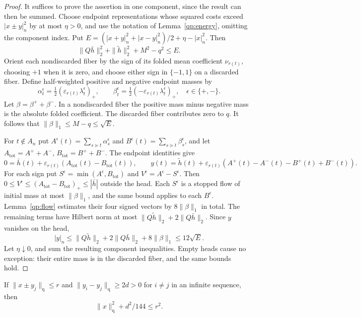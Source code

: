 \begin{proof}
It suffices to prove the assertion in one component, since the
result can then be summed.  Choose endpoint representations whose
squared costs exceed $|x\pm y|_n^2$ by at most $\eta>0$, and use
the notation of Lemma~\ref{qp:energy}, omitting the component index.
Put $E=(|x+y|_n^2+|x-y|_n^2)/2+\eta-|x|_n^2$.
Then
\[
 \|Q\bar h\|_2^2+\|\widetilde h\|_2^2+M^2-q^2\le E.
\]
Orient each nondiscarded fiber by the sign of its folded mean
coefficient $\nu_{r(t)}$, choosing $+1$ when it is zero, and choose
either sign in $\{-1,1\}$ on a discarded fiber.
Define half-weighted positive and negative endpoint masses by
\[
 \alpha_t^\epsilon=\tfrac12(\varepsilon_{r(t)}
                         \lambda_t^\epsilon)_+,
 \qquad
 \beta_t^\epsilon=\tfrac12(-\varepsilon_{r(t)}
                         \lambda_t^\epsilon)_+,
 \quad\epsilon\in\{+,-\}.
\]
Let $\beta=\beta^++\beta^-$.  In a nondiscarded fiber the
positive mass minus negative mass is the absolute folded
coefficient.  The discarded fiber contributes zero to $q$.
It follows that $\|\beta\|_1\le M-q\le\sqrt E$.

For $t\notin A_n$ put
$A^\epsilon(t)=\sum_{s\succeq t}\alpha_s^\epsilon$ and
$B^\epsilon(t)=\sum_{s\succeq t}\beta_s^\epsilon$,
and let $A_{\mathrm{tot}}=A^++A^-$,
$B_{\mathrm{tot}}=B^++B^-$. The endpoint identities give
\[
 0=\bar h(t)+\varepsilon_{r(t)}(A_{\mathrm{tot}}(t)-B_{\mathrm{tot}}(t)),
 \qquad
 y(t)=\widetilde h(t)+\varepsilon_{r(t)}
          (A^+(t)-A^-(t)-B^+(t)+B^-(t)).
\]
For each sign put $S^\epsilon=\min(A^\epsilon,B_{\mathrm{tot}})$ and
$V^\epsilon=A^\epsilon-S^\epsilon$.  Then
$0\le V^\epsilon\le(A_{\mathrm{tot}}-B_{\mathrm{tot}})_+
\le|\bar h|$ outside the head.
Each $S^\epsilon$ is a stopped flow of initial mass at most
$\|\beta\|_1$, and the same bound applies to each
$B^\epsilon$.  Lemma~\ref{qp:flow} estimates their four signed
vectors by $8\|\beta\|_1$ in total.  The remaining terms have
Hilbert norm at most $\|Q\widetilde h\|_2+2\|Q\bar h\|_2$.
Since $y$ vanishes on the head,
\[
 |y|_n\le\|Q\widetilde h\|_2+2\|Q\bar h\|_2
                 +8\|\beta\|_1\le12\sqrt E.
\]
Let $\eta\downarrow0$, and sum the resulting component
inequalities.  Empty heads cause no exception: their entire mass
is in the discarded fiber, and the same bounds hold.
\end{proof}

\begin{corollary}\label{qp:lens-twelve}
If $\|x\pm y_j\|_{\mathrm q}\le r$ and
$\|y_i-y_j\|_{\mathrm q}\ge2d>0$ for $i\ne j$ in an infinite
sequence, then
\[
 \|x\|_{\mathrm q}^2+d^2/144\le r^2.
\]
\end{corollary}

